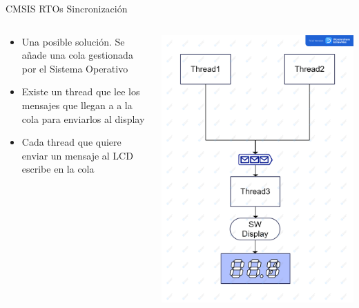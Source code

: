 \begin{frame}{CMSIS RTOs Sincronización}
    \begin{columns}
        \begin{column}{0.50\textwidth}
            \begin{itemize}
                \item Una posible solución. Se añade una cola gestionada por el Sistema Operativo
                \item Existe un thread que lee los mensajes que llegan a a la cola para enviarlos al display 
                \item Cada thread que quiere enviar un mensaje al LCD escribe en la cola
            \end{itemize}    
        \end{column}
        \begin{column}{0.50\textwidth}
            \includegraphics[scale=0.05]{presentation/threads-sync.jpg}
        \end{column}
    \end{columns}
\end{frame}

